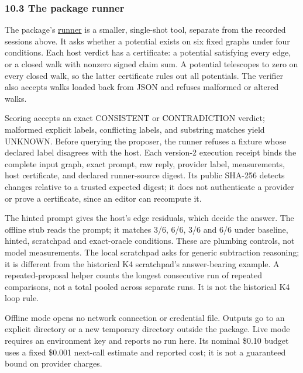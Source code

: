 \documentclass[
  11pt,
]{article}
\begin{document}
\hypertarget{the-package-runner}{%
\subsubsection{10.3 The package runner}\label{the-package-runner}}

The package's
\href{https://github.com/dbccpage/the_symbol_game/blob/main/education/documentation/030_pfp_proposal_fidelity_protocol_pfp/papers/symbol_game/008_pfp_mssn_tower_challenges_and_retraction_benchmarks/code/retraction_benchmark_runner.py}{runner}
is a smaller, single-shot tool, separate from the recorded sessions
above. It asks whether a potential exists on six fixed graphs under four
conditions. Each host verdict has a certificate: a potential satisfying
every edge, or a closed walk with nonzero signed claim sum. A potential
telescopes to zero on every closed walk, so the latter certificate rules
out all potentials. The verifier also accepts walks loaded back from
JSON and refuses malformed or altered walks.

Scoring accepts an exact CONSISTENT or CONTRADICTION verdict; malformed
explicit labels, conflicting labels, and substring matches yield
UNKNOWN. Before querying the proposer, the runner refuses a fixture
whose declared label disagrees with the host. Each version-2 execution
receipt binds the complete input graph, exact prompt, raw reply,
provider label, measurements, host certificate, and declared
runner-source digest. Its public SHA-256 detects changes relative to a
trusted expected digest; it does not authenticate a provider or prove a
certificate, since an editor can recompute it.

The hinted prompt gives the host's edge residuals, which decide the
answer. The offline stub reads the prompt; it matches 3/6, 6/6, 3/6 and
6/6 under baseline, hinted, scratchpad and exact-oracle conditions.
These are plumbing controls, not model measurements. The local
scratchpad asks for generic subtraction reasoning; it is different from
the historical K4 scratchpad's answer-bearing example. A
repeated-proposal helper counts the longest consecutive run of repeated
comparisons, not a total pooled across separate runs. It is not the
historical K4 loop rule.

Offline mode opens no network connection or credential file. Outputs go
to an explicit directory or a new temporary directory outside the
package. Live mode requires an environment key and reports no run here.
Its nominal \$0.10 budget uses a fixed \$0.001 next-call estimate and
reported cost; it is not a guaranteed bound on provider charges.
\end{document}
